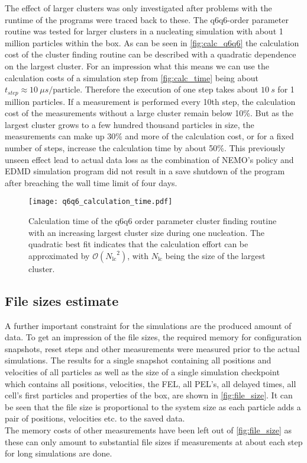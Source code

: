 The effect of larger clusters was only investigated after problems with the runtime of the programs were traced back to these. The q6q6-order parameter routine was tested for larger clusters in a nucleating simulation with about 1 million particles within the box. As can be seen in \autoref{fig:calc_q6q6} the calculation cost of the cluster finding routine can be described with a quadratic dependence on the largest cluster. For an impression what this means we can use the calculation costs of a simulation step from \autoref{fig:calc_time} being about $t_{step} \approx \SI{10}{\mu s \per \text{particle} }$. Therefore the execution of one step takes about $\SI{10}{s}$ for 1 million particles. If a measurement is performed every 10th step, the calculation cost of the measurements without a large cluster remain below 10\%. But as the largest cluster grows to a few hundred thousand particles in size, the measurements can make up 30\% and more of the calculation cost, or for a fixed number of steps, increase the calculation time by about 50\%. This previously unseen effect lead to actual data loss as the combination of NEMO's policy and EDMD simulation program did not result in a save shutdown of the program after breaching the wall time limit of four days.\\

\begin{figure}[h!]
\centering
\texttt{[image: q6q6\_calculation\_time.pdf]}
\caption[Quadratic calculation time of q6q6-order parameter cluster finding routine]{Calculation time of the q6q6 order parameter cluster finding routine with an increasing largest cluster size during one nucleation. The quadratic best fit indicates that the calculation effort can be approximated by $\mathcal{O}({N_{\text{lc}}}^2)$, with $N_{\text{lc}}$ being the size of the largest cluster.}
\label{fig:calc_q6q6}
\end{figure}


\subsection{File sizes estimate}
\label{sec:file_size}
A further important constraint for the simulations are the produced amount of data. To get an impression of the file sizes, the required memory for configuration snapshots, reset steps and other measurements were measured prior to the actual simulations. The results for a single snapshot containing all positions and velocities of all particles as well as the size of a single simulation checkpoint which contains all positions, velocities, the FEL, all PEL's, all delayed times, all cell's first particles and properties of the box, are shown in \autoref{fig:file_size}. It can be seen that the file size is proportional to the system size as each particle adds a pair of positions, velocities etc. to the saved data.\\
The memory costs of other measurements have been left out of \autoref{fig:file_size} as these can only amount to substantial file sizes if measurements at about each step for long simulations are done.\\  

